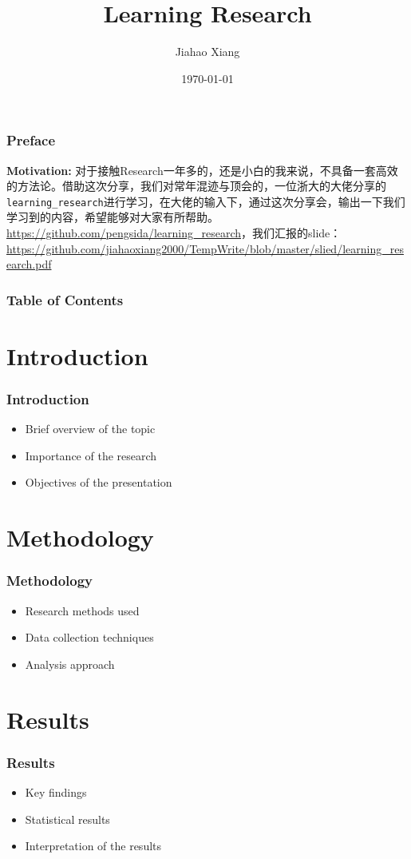 \documentclass{beamer}
\title{\textbf{Learning Research}}
\author[xjh]{Jiahao Xiang\inst{1}}
\institute{
    \inst{1}
    Hengyang Normal University
}
\date{\today}
\begin{document}
\begin{frame}
    \titlepage
\end{frame}

\begin{frame}
    \frametitle{Preface}
    \textbf{Motivation:} 对于接触Research一年多的，还是小白的我来说，不具备一套高效的方法论。借助这次分享，我们对常年混迹与顶会的，一位浙大的大佬分享的\texttt{learning\_research}进行学习，在大佬的输入下，通过这次分享会，输出一下我们学习到的内容，希望能够对大家有所帮助。
    \vfill
    \url{https://github.com/pengsida/learning_research}，我们汇报的slide：
    \url{https://github.com/jiahaoxiang2000/TempWrite/blob/master/slied/learning_research.pdf}
\end{frame}

\begin{frame}
    \frametitle{Table of Contents}
    \tableofcontents
\end{frame}

\section{Introduction}
\begin{frame}
    \frametitle{Introduction}
    \begin{itemize}
        \item Brief overview of the topic
        \item Importance of the research
        \item Objectives of the presentation
    \end{itemize}
\end{frame}

\section{Methodology}
\begin{frame}
    \frametitle{Methodology}
    \begin{itemize}
        \item Research methods used
        \item Data collection techniques
        \item Analysis approach
    \end{itemize}
\end{frame}

\section{Results}
\begin{frame}
    \frametitle{Results}
    \begin{itemize}
        \item Key findings
        \item Statistical results
        \item Interpretation of the results
    \end{itemize}
\end{frame}
\end{document}
